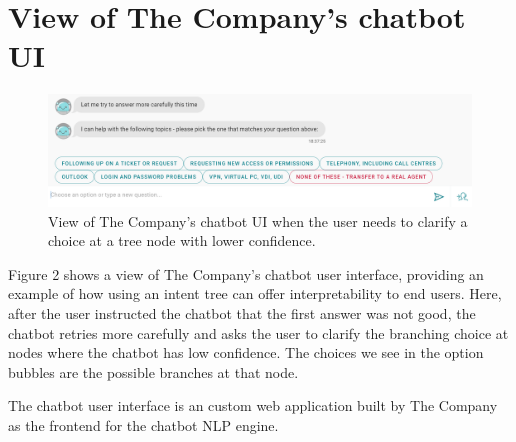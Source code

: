 \documentclass[sigconf, anonymous=true]{acmart}
\begin{document}
\section{View of The Company's chatbot UI}
\label{sec:wallyUIclip}

\begin{figure}[ht]
  \includegraphics[width=\textwidth]{pic/wallyClip.PNG}
  \centering
  \caption{View of The Company's chatbot UI when the user needs to clarify a choice at a tree node with lower confidence.}
\end{figure}

Figure 2 shows a view of The Company's chatbot user interface, providing an example of how using an intent tree can offer interpretability to end users. Here, after the user instructed the chatbot that the first answer was not good, the chatbot retries more carefully and asks the user to clarify the branching choice at nodes where the chatbot has low confidence. The choices we see in the option bubbles are the possible branches at that node. 

The chatbot user interface is an custom web application built by The Company as the frontend for the chatbot NLP engine.
\end{document}
